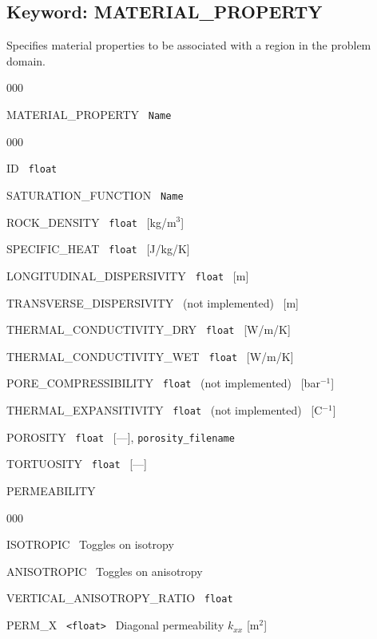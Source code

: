 \documentclass[12pt]{article}
\begin{document}



\newpage
\protect\hypertarget{target_mat}{}

\subsection{Keyword: MATERIAL\_PROPERTY}

 Specifies material properties to be associated with a region in the problem domain.

\begin{deflist}{000}
\item[MATERIAL\_PROPERTY] \ {\tt Name}
\begin{deflist}{000}
\item[ID] \ {\tt float}
\item[SATURATION\_FUNCTION] \ {\tt Name}
\item[ROCK\_DENSITY] \ {\tt float} \ [kg/m$^3$]
\item[SPECIFIC\_HEAT] \ {\tt float} \ [J/kg/K]
\item[LONGITUDINAL\_DISPERSIVITY] \ {\tt float} \ [m]
\item[TRANSVERSE\_DISPERSIVITY] \ (not implemented) \ [m]
\item[THERMAL\_CONDUCTIVITY\_DRY] \ {\tt float} \ [W/m/K]
\item[THERMAL\_CONDUCTIVITY\_WET] \ {\tt float} \ [W/m/K]
\item[PORE\_COMPRESSIBILITY] \ {\tt float} \ (not implemented) \ [bar$^{-1}$]
\item[THERMAL\_EXPANSITIVITY] \ {\tt float} \ (not implemented) \ [C$^{-1}$]
\item[POROSITY] \ {\tt float} \ [---], {\tt porosity\_filename}
\item[TORTUOSITY] \ {\tt float} \ [---]
\item[PERMEABILITY] ~
\begin{deflist}{000}
\item[ISOTROPIC] \ Toggles on isotropy
\item[ANISOTROPIC] \ Toggles on anisotropy
\item[VERTICAL\_ANISOTROPY\_RATIO] \ {\tt float}
\item[PERM\_X] \ {\tt <float>} \ Diagonal permeability $k_{xx}$ [m$^2$]

\end{deflist}
\end{deflist}
\end{deflist}
\end{document}
